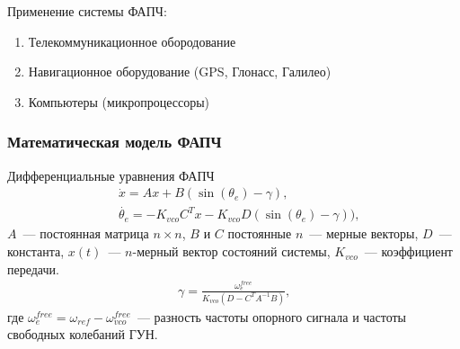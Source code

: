 \documentclass{beamer}
\begin{document}
\begin{frame}
Применение системы ФАПЧ:
\begin{enumerate}
\item Телекоммуникационное обородование
\item Навигационное оборудование (GPS, Глонасс, Галилео)
\item Компьютеры (микропроцессоры)
\end{enumerate}
\end{frame}


\begin{frame}
\frametitle{Математическая модель ФАПЧ}
\begin{center}
\end{center}
Дифференциальные уравнения ФАПЧ
 \begin{equation}\label{system}
 \begin{aligned}
 &\dot{x} = Ax + B(\operatorname{sin}(\theta_e) - \gamma)\text{,}\\[0.3pt]
 &\dot{\theta_e} = -K_{vco}C^T x -K_{vco}D(\operatorname{sin}(\theta_e) - \gamma))\text{,}
 \end{aligned}
\end{equation}
$A$~--- постоянная матрица $n \times n$, $B$ и $C$ постоянные $n$~--- мерные векторы, $D$~--- константа, $x(t)$~--- $n$-мерный вектор состояний системы, $K_{vco}$~--- коэффициент передачи.\vspace{-1mm}
 \begin{equation}\label{gamma}
 \begin{aligned}
\gamma = \frac{\omega_e^{free}}{K_{vco}\left(D-C^T A^{-1}B\right)}\text{,}
 \end{aligned}
\end{equation}
где $\omega^{free}_{e}=\omega_{ref}-\omega_{vco}^{free}$~--- разность частоты опорного сигнала и частоты свободных колебаний ГУН.

\end{frame}
\end{document}
